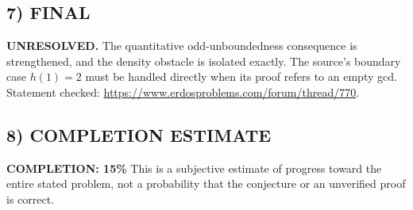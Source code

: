 \subsection*{7) FINAL}
\textbf{UNRESOLVED.} The quantitative odd-unboundedness consequence is strengthened, and the density obstacle is isolated exactly. The source's boundary case $h(1)=2$ must be handled directly when its proof refers to an empty gcd.
\noindent Statement checked: \url{https://www.erdosproblems.com/forum/thread/770}.

\subsection*{8) COMPLETION ESTIMATE}
\textbf{COMPLETION: 15\%}
This is a subjective estimate of progress toward the entire stated problem, not a probability that the conjecture or an unverified proof is correct.
